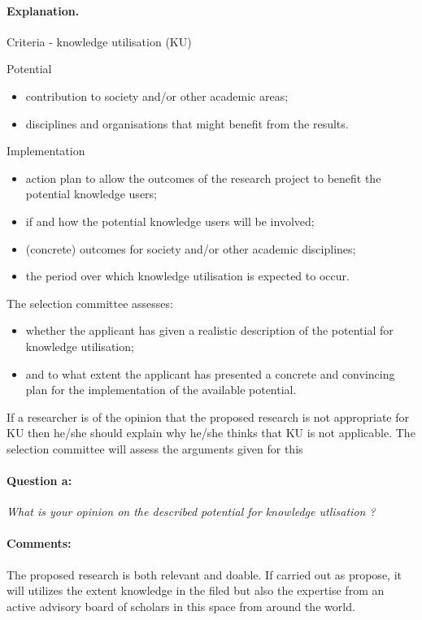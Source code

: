 \documentclass[twocolumn, serif, rga, numeric]{jote-article}
\begin{document}
\paragraph{Explanation.}
Criteria - knowledge utilisation (KU)

\noindent Potential 
\begin{itemize}
\item contribution to society and/or other academic areas; \item disciplines and organisations that might benefit from the results. 
\end{itemize}
Implementation \begin{itemize}

\item action plan to allow the outcomes of the research project to benefit the potential knowledge users; \item if and how the potential knowledge users will be involved; \item (concrete) outcomes for society and/or other academic disciplines;\item the period over which knowledge utilisation is expected to occur. 
\end{itemize}
The selection committee assesses: 
\begin{itemize}


\item whether the applicant has given a realistic description of the potential for knowledge utilisation; \item and to what extent the applicant has presented a concrete and convincing plan for the implementation of the available potential. 
\end{itemize}

If a researcher is of the opinion that the proposed research is not appropriate for KU then he/she should explain why he/she thinks that KU is not applicable. The selection committee will assess the arguments given for this
\paragraph{Question a:}
\textit{What is your opinion on the described potential for knowledge utlisation ?}
\paragraph{Comments:}
The proposed research is both relevant and doable. If carried out as propose, it will utilizes the extent knowledge in the filed but also the expertise from an active advisory board of scholars in this space from around the world.
\end{document}
